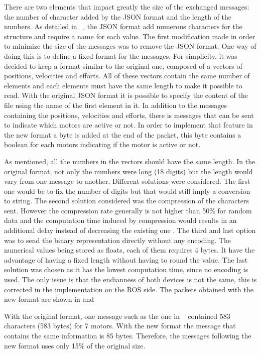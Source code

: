 There are two elements that impact greatly the size of the exchanged messages: the number of character added by the JSON format and the length of the numbers.
As detailed in ~, the JSON format add numerous characters for the structure and require a name for each value. The first modification made in order to minimize the size of the messages was to remove the JSON format. One way of doing this is to define a fixed format for the messages. For simplicity, it was decided to keep a format similar to the original one, composed of a vectors of positions, velocities and efforts. All of these vectors contain the same number of elements and each elements must have the same length to make it possible to read. 
With the original \gls{JSON} format it is possible to specify the content of the file using the name of the first element in it. In addition to the messages containing the positions, velocities and efforts, there is messages that can be sent to indicate which motors are active or not. In order to implement that feature in the new format a byte is added at the end of the packet, this byte contains a boolean for each motors indicating if the motor is active or not.

As mentioned, all the numbers in the vectors should have the same length. In the original format, not only the numbers were long (18 digits) but the length would vary from one message to another. Different solutions were considered. The first one would be to fix the number of digits but that would still imply a conversion to string. The second solution considered was the compression of the characters sent. However the compression rate generally is not higher than 50\% for random data and the computation time induced by compression would results in an additional delay instead of decreasing the existing one \cite{simple_compression}\cite{fast_ZIV}. The third and last option was to send the binary representation directly without any encoding. The numerical values being stored as floats, each of them requires 4 bytes. It have the advantage of having a fixed length without having to round the value. The last solution was chosen as it has the lowest computation time, since no encoding is used. The only issue is that the endianness of both devices is not the same, this is corrected in the implementation on the ROS side. The packets obtained with the new format are shown in  and 

With the original format, one message such as the one in ~ contained 583 characters (583 bytes) for 7 motors. With the new format the message that contains the same information is 85 bytes. Therefore, the messages following the new format uses only 15\% of the original size.

